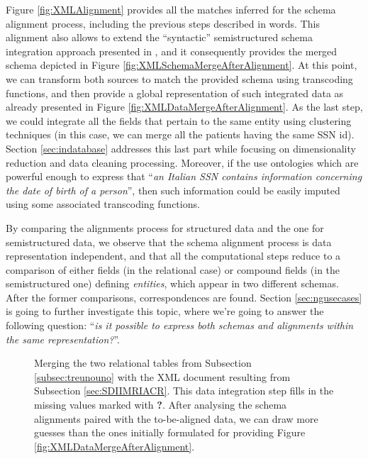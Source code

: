 Figure \ref{fig:XMLAlignment} provides all the matches inferred for the schema  alignment process, including the previous steps described in words. This alignment also allows to extend the ``syntactic'' semistructured schema integration approach presented in  \cite{BaaziziLCGS17}, and it consequently provides the merged schema depicted in Figure \ref{fig:XMLSchemaMergeAfterAlignment}. At this point, we can transform both sources  to match the provided schema using transcoding functions, and then provide a global representation of such integrated data as already presented in Figure \vref{fig:XMLDataMergeAfterAlignment}. As the last step, we could integrate all the fields that pertain to the same entity using clustering techniques (in this case, we can merge all the patients having the same SSN id). Section \ref{sec:indatabase} addresses this last part while focusing on dimensionality reduction and data cleaning processing. Moreover, if the use ontologies which are powerful enough to express that ``\textit{an Italian SSN contains information concerning the date of birth of a person}'', then such information could be easily imputed using some associated transcoding functions.

By comparing the alignments  process for structured data and the one for semistructured data, we observe that the schema alignment process is  data representation independent, and that all the computational steps reduce to a comparison of either fields (in the relational case) or compound fields (in the semistructured one) defining \textit{entities}, which appear in two different schemas. After the former comparisons, correspondences are found.
Section \vref{sec:ngusecases}  is going to further investigate this topic,  where we're going to answer the following question: ``\textit{is it possible to express both schemas and alignments within the same representation?}''.

\begin{figure}
  
  \caption{Merging the two relational tables from Subsection \ref{subsec:treunouno} with the XML document resulting from Subsection
  	\ref{sec:SDIIMRIACR}. This data integration step  fills in the missing values marked with {\color{red}\textbf{?}}. After analysing the schema alignments paired with the to-be-aligned data, we can draw more guesses than the ones initially formulated for providing Figure \vref{fig:XMLDataMergeAfterAlignment}.}
  \label{fig:XMLDataMergeWithTheTwoTables}
\end{figure}

